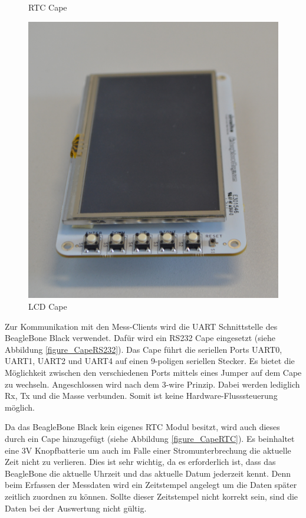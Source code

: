 \begin{figure}[!htb]
  \caption{RTC Cape}\label{figure_CapeRTC}
\endminipage\hfill
{}%
  \includegraphics[width=\linewidth]{img/general/CapeLCD.png}
  \caption{LCD Cape}\label{figure_CapeLCD}
\endminipage
\end{figure}


Zur Kommunikation mit den Mess-Clients wird die \ac{UART} Schnittstelle des BeagleBone Black verwendet. Dafür wird ein RS232 Cape eingesetzt (siehe Abbildung \ref{figure_CapeRS232}). Das Cape führt die seriellen Ports UART0, UART1, UART2 und UART4 auf einen 9-poligen seriellen Stecker. Es bietet die Möglichkeit zwischen den verschiedenen Ports mittels eines Jumper auf dem Cape zu wechseln. Angeschlossen wird nach dem 3-wire Prinzip. Dabei werden lediglich Rx, Tx und die Masse verbunden. Somit ist keine Hardware-Flusssteuerung möglich.\ 

Da das BeagleBone Black kein eigenes \ac{RTC} Modul besitzt, wird auch dieses durch ein Cape hinzugefügt (siehe Abbildung \ref{figure_CapeRTC}). Es beinhaltet eine 3V Knopfbatterie um auch im Falle einer Stromunterbrechung die aktuelle Zeit nicht zu verlieren. Dies ist sehr wichtig, da es erforderlich ist, dass das BeagleBone die aktuelle Uhrzeit und das aktuelle Datum jederzeit kennt. Denn beim Erfassen der Messdaten wird ein Zeitstempel angelegt um die Daten später zeitlich zuordnen zu können. Sollte dieser Zeitstempel nicht korrekt sein, sind die Daten bei der Auswertung nicht gültig.\ 

